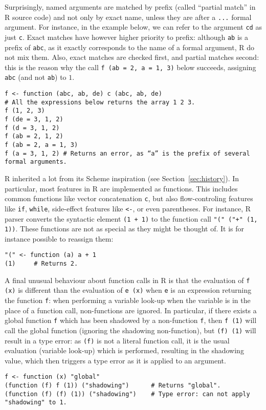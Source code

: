 \documentclass{article}
\newcommand\R{R}
\begin{document}
Surprisingly, named arguments are matched by prefix
(called “partial match” in \R{} source code) and not only by exact name,
unless they are after a \texttt{...} formal argument.
For instance, in the example below,
we can refer to the argument \texttt{cd} as just \texttt{c}.
Exact matches have however higher priority to prefix:
although \texttt{ab} is a prefix of \texttt{abc},
as it exactly corresponds to the name of a formal argument,
\R{} do not mix them.
Also, exact matches are checked first, and partial matches second:
this is the reason why the call \texttt{f (ab = 2, a = 1, 3)}
below succeeds, assigning \texttt{abc}
(and not \texttt{ab}) to \(1\).
\begin{verbatim}
f <- function (abc, ab, de) c (abc, ab, de)
# All the expressions below returns the array 1 2 3.
f (1, 2, 3)
f (de = 3, 1, 2)
f (d = 3, 1, 2)
f (ab = 2, 1, 2)
f (ab = 2, a = 1, 3)
f (a = 3, 1, 2) # Returns an error, as “a” is the prefix of several formal arguments.
\end{verbatim}

\R{} inherited a lot from its Scheme inspiration (see Section~\ref{sec:history}).
In particular, most features in \R{} are implemented as functions.
This includes common functions like vector concatenation \texttt{c},
but also flow-controling features like \texttt{if}, \texttt{while},
side-effect features like \texttt{<-}, or even parentheses.
For instance, \R{} parser converts the syntactic element \texttt{(1 + 1)}
to the function call \texttt{"(" ("+" (1, 1))}.%
These functions are not as special as they might be thought of.
It is for instance possible to reassign them:
\begin{verbatim}
"(" <- function (a) a + 1
(1)     # Returns 2.
\end{verbatim}

A final unusual behaviour about function calls in \R{}
is that the evaluation of \texttt{f (x)} is different
than the evaluation of \texttt{e (x)} when \texttt{e}
is an expression returning the function \texttt{f}:
when performing a variable look-up when the variable is in the place
of a function call, non-functions are ignored.
In particular, if there exists a global function \texttt{f}
which has been shadowed by a non-function \texttt{f},
then \texttt{f (1)} will call the global function
(ignoring the shadowing non-function),
but \texttt{(f) (1)} will result in a type error:
as \texttt{(f)} is not a literal function call,
it is the usual evaluation (variable look-up) which is performed,
resulting in the shadowing value,
which then triggers a type error as it is applied to an argument.
\begin{verbatim}
f <- function (x) "global"
(function (f) f (1)) ("shadowing")      # Returns "global".
(function (f) (f) (1)) ("shadowing")    # Type error: can not apply "shadowing" to 1.
\end{verbatim}
\end{document}
